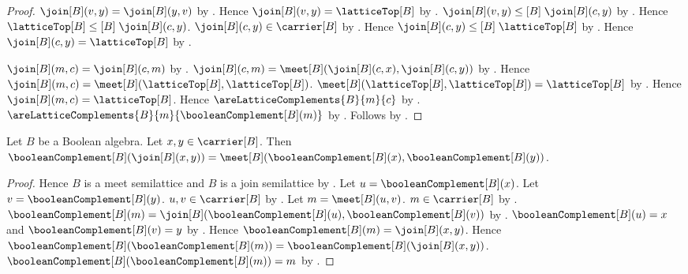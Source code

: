 \begin{proof}
    $\join[B](v,y)=\join[B](y,v)$ by .
    Hence $\join[B](v,y)=\latticeTop[B]$ by
        .
    $\join[B](v,y)\mathrel{\leq[B]}\join[B](c,y)$ by
        .
    Hence $\latticeTop[B]\mathrel{\leq[B]}\join[B](c,y)$.
    $\join[B](c,y)\in\carrier[B]$ by .
    Hence $\join[B](c,y)\mathrel{\leq[B]}\latticeTop[B]$ by
        .
    Hence $\join[B](c,y)=\latticeTop[B]$ by .

    $\join[B](m,c)=\join[B](c,m)$ by .
    $\join[B](c,m)
        =\meet[B](\join[B](c,x),\join[B](c,y))$ by
        .
    Hence $\join[B](m,c)=\meet[B]
        (\latticeTop[B],\latticeTop[B])$.
    $\meet[B](\latticeTop[B],\latticeTop[B])
        =\latticeTop[B]$ by .
    Hence $\join[B](m,c)=\latticeTop[B]$.
    Hence $\areLatticeComplements{B}{m}{c}$ by
        .
    $\areLatticeComplements
        {B}{m}{\booleanComplement[B](m)}$ by
        .
    Follows by .
\end{proof}

\begin{theorem}\label{boolean_complement_join}
    Let $B$ be a Boolean algebra.
    Let $x,y\in\carrier[B]$.
    Then $\booleanComplement[B](\join[B](x,y))
        =\meet[B]
            (\booleanComplement[B](x),\booleanComplement[B](y))$.
\end{theorem}
\begin{proof}
    Hence $B$ is a meet semilattice and $B$ is a join semilattice by
        .
    Let $u=\booleanComplement[B](x)$.
    Let $v=\booleanComplement[B](y)$.
    $u,v\in\carrier[B]$ by .
    Let $m=\meet[B](u,v)$.
    $m\in\carrier[B]$ by .
    $\booleanComplement[B](m)
        =\join[B]
            (\booleanComplement[B](u),\booleanComplement[B](v))$ by
        .
    $\booleanComplement[B](u)=x$ and
        $\booleanComplement[B](v)=y$ by
        .
    Hence $\booleanComplement[B](m)=\join[B](x,y)$.
    Hence $\booleanComplement[B](\booleanComplement[B](m))
        =\booleanComplement[B](\join[B](x,y))$.
    $\booleanComplement[B](\booleanComplement[B](m))=m$ by
        .
\end{proof}

